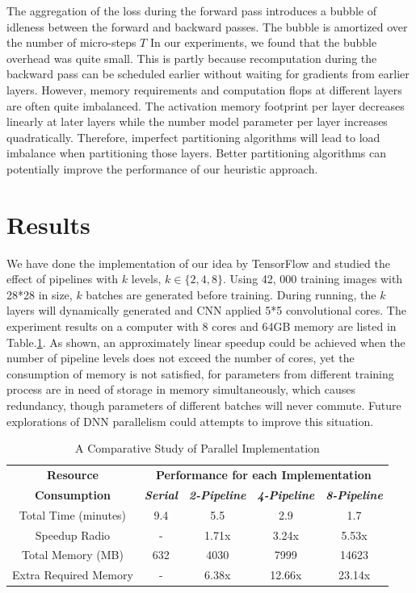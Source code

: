 \documentclass[conference]{IEEEtran}
\begin{document}
The aggregation of the loss during the forward pass introduces a bubble of idleness between the forward and backward passes. The bubble is amortized over the number of micro-steps $T$ In our experiments, we found that the bubble overhead was quite small. This is partly because recomputation during the backward pass can be scheduled earlier without waiting for gradients from earlier layers. However, memory requirements and computation flops at different layers are often quite imbalanced. The activation memory footprint per layer decreases linearly at later layers while the number model parameter per layer increases quadratically. Therefore, imperfect partitioning algorithms will lead to load imbalance when partitioning those layers. Better partitioning algorithms can potentially improve the performance of our heuristic approach.

\section{Results}

We have done the implementation of our idea by TensorFlow and studied the effect of pipelines with $k$ levels, $k \in \{2, 4, 8\}$. Using 42, 000 training images with 28*28 in size, $k$ batches are generated before training. During running, the $k$ layers will dynamically generated and CNN applied 5*5 convolutional cores. The experiment results on a computer with 8 cores and 64GB memory are listed in Table.\ref{tab_result}. As shown, an approximately linear speedup could be achieved when the number of pipeline levels does not exceed the number of cores, yet the consumption of memory is not satisfied, for parameters from different training process are in need of storage in memory simultaneously, which causes redundancy, though parameters of different batches will never commute. Future explorations of DNN parallelism could attempts to improve this situation.

\begin{table}[htbp]
\caption{A Comparative Study of Parallel Implementation}{}
\begin{center}
\begin{tabular}{|c|c|c|c|c|}
\hline
\textbf{Resource}&\multicolumn{4}{|c|}{\textbf{Performance for each Implementation}} \\
\cline{2-5} 
\textbf{Consumption} & \textbf{\textit{Serial}} & \textbf{\textit{2-Pipeline}} & \textbf{\textit{4-Pipeline}} & \textbf{\textit{8-Pipeline}}\\
\hline
Total Time (minutes) & 9.4 & 5.5 & 2.9 & 1.7\\
\hline
Speedup Radio & - & 1.71x & 3.24x & 5.53x\\
\hline
Total Memory (MB) & 632 & 4030 & 7999 & 14623 \\
\hline
Extra Required Memory & - & 6.38x & 12.66x & 23.14x \\
\hline
\end{tabular}
\label{tab_result}
\end{center}
\end{table}
\end{document}
